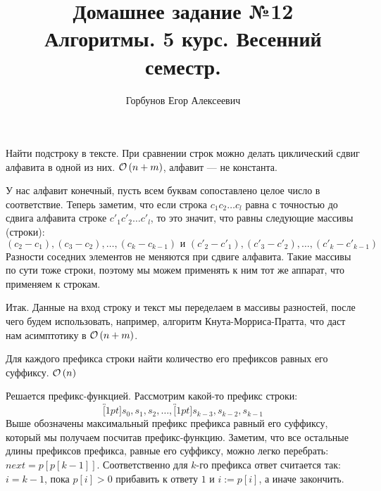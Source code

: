 

\title{Домашнее задание №12 \\ Алгоритмы. 5 курс. Весенний семестр.}
\author{Горбунов Егор Алексеевич}


\maketitle

\begin{task}[1]
Найти подстроку в тексте. При сравнении строк можно делать циклический сдвиг алфавита в одной из них. $\mathcal{O}\left(n + m\right)$, алфавит --- не константа.
\end{task}
\begin{solution}
У нас алфавит конечный, пусть всем буквам сопоставлено целое число в соответствие. Теперь заметим, что если строка $c_1c_2\ldots c_l$ равна с точностью до сдвига алфавита строке $c'_1c'_2\ldots c'_l$, то это значит, что равны следующие массивы (строки):
\[
	(c_2 - c_1), (c_3 - c_2), \ldots, (c_k - c_{k-1}) \text{ и } (c'_2 - c'_1), (c'_3 - c'_2), \ldots, (c'_k - c'_{k-1})
\]
Разности соседних элементов не меняются при сдвиге алфавита.
Такие массивы по сути тоже строки, поэтому мы можем применять к ним тот же аппарат, что применяем к строкам.

Итак. Данные на вход строку и текст мы переделаем в массивы разностей, после чего будем использовать, например, алгоритм Кнута-Морриса-Пратта, что даст нам асимптотику в $\mathcal{O}\left(n + m\right)$. \xqed 
\end{solution}


\begin{task}[2]
Для каждого префикса строки найти количество его префиксов равных его суффиксу. $\mathcal{O}\left(n\right)$
\end{task}
\begin{solution}
Решается префикс-функцией. Рассмотрим какой-то префикс строки:
\[
    \overbracket[1pt]{s_0, s_1, s_2}, \ldots, \overbracket[1pt]{s_{k-3}, s_{k-2}, s_{k-1}}
\]
Выше обозначены максимальный префикс префикса равный его суффиксу, который мы получаем посчитав префикс-функцию.
Заметим, что все остальные длины префиксов префикса, равные его суффиксу, можно легко перебрать:
$next = p[p[k-1]]$. Соответственно для $k$-го префикса ответ считается так: $i = k-1$, пока $p[i] > 0$ прибавить к ответу $1$ и $i := p[i]$, а иначе закончить. \xqed
\end{solution}


